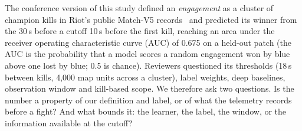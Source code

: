 The conference version of this study defined an \emph{engagement} as a cluster of champion kills
in Riot's public Match-V5 records~\cite{riotapi2024matchv5,riotapi2024timeline} and predicted its
winner from the 30\,s before a cutoff 10\,s before the first kill, reaching an area under the
receiver operating characteristic curve (AUC) of 0.675 on a held-out patch (the AUC is the
probability that a model scores a random engagement won by blue above one lost by blue; 0.5 is
chance). Reviewers questioned its thresholds (18\,s between kills, 4,000 map units across a
cluster), label weights, deep baselines, observation window and kill-based scope. We therefore ask
two questions. Is the number a property of our definition and label, or of what the telemetry
records before a fight? And what bounds it: the learner, the label, the window, or the information
available at the cutoff?

